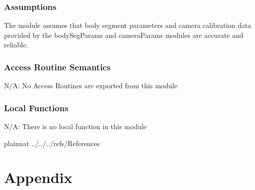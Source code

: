 \documentclass[12pt, titlepage]{article}
\begin{document}
\subsubsection{Assumptions}
The module assumes that body segment parameters and camera calibration data provided by the bodySegParams and cameraParams modules are accurate and reliable.

\subsubsection{Access Routine Semantics}
N/A: No Access Routines are exported from this module

\subsubsection{Local Functions}
N/A: There is no local function in this module

\newpage

 {plainnat}
 {../../../refs/References}

\newpage

\section{Appendix} \label{Appendix}

\end{document}

